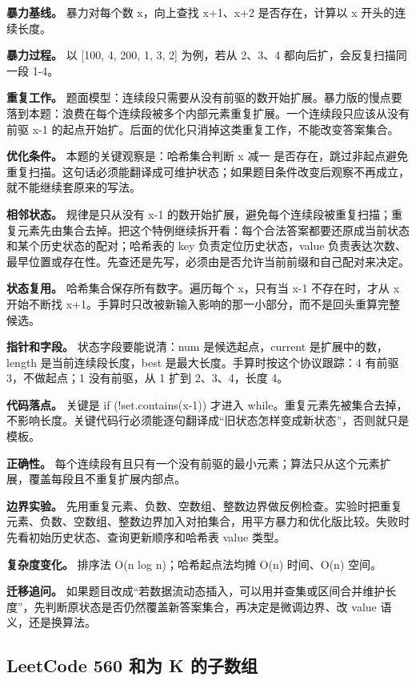 \textbf{暴力基线。} 暴力对每个数 x，向上查找 x+1、x+2 是否存在，计算以 x 开头的连续长度。

\textbf{暴力过程。} 以 [100, 4, 200, 1, 3, 2] 为例，若从 2、3、4 都向后扩，会反复扫描同一段 1-4。

\textbf{重复工作。} 题面模型：连续段只需要从没有前驱的数开始扩展。暴力版的慢点要落到本题：浪费在每个连续段被多个内部元素重复扩展。一个连续段只应该从没有前驱 x-1 的起点开始扩。后面的优化只消掉这类重复工作，不能改变答案集合。

\textbf{优化条件。} 本题的关键观察是：哈希集合判断 x 减一 是否存在，跳过非起点避免重复扫描。这句话必须能翻译成可维护状态；如果题目条件改变后观察不再成立，就不能继续套原来的写法。

\textbf{相邻状态。} 规律是只从没有 x-1 的数开始扩展，避免每个连续段被重复扫描；重复元素先由集合去掉。把这个特例继续拆开看：每个合法答案都要还原成当前状态和某个历史状态的配对；哈希表的 key 负责定位历史状态，value 负责表达次数、最早位置或存在性。先查还是先写，必须由是否允许当前前缀和自己配对来决定。

\textbf{状态复用。} 哈希集合保存所有数字。遍历每个 x，只有当 x-1 不存在时，才从 x 开始不断找 x+1。手算时只改被新输入影响的那一小部分，而不是回头重算完整候选。

\textbf{指针和字段。} 状态字段要能说清：num 是候选起点，current 是扩展中的数，length 是当前连续段长度，best 是最大长度。手算时按这个协议跟踪：4 有前驱 3，不做起点；1 没有前驱，从 1 扩到 2、3、4，长度 4。

\textbf{代码落点。} 关键是 if (!set.contains(x-1)) 才进入 while。重复元素先被集合去掉，不影响长度。关键代码行必须能逐句翻译成“旧状态怎样变成新状态”，否则就只是模板。

\textbf{正确性。} 每个连续段有且只有一个没有前驱的最小元素；算法只从这个元素扩展，覆盖每段且不重复扩展内部点。

\textbf{边界实验。} 先用重复元素、负数、空数组、整数边界做反例检查。实验时把重复元素、负数、空数组、整数边界加入对拍集合，用平方暴力和优化版比较。失败时先看初始历史状态、查询更新顺序和哈希表 value 类型。

\textbf{复杂度变化。} 排序法 O(n log n)；哈希起点法均摊 O(n) 时间、O(n) 空间。

\textbf{迁移追问。} 如果题目改成“若数据流动态插入，可以用并查集或区间合并维护长度”，先判断原状态是否仍然覆盖新答案集合，再决定是微调边界、改 value 语义，还是换算法。

\subsection{LeetCode 560 和为 K 的子数组}

